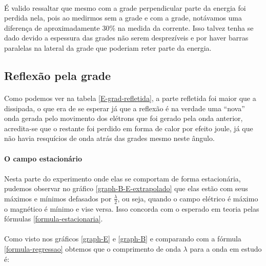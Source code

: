 \documentclass[a4paper,11pt]{article}
\begin{document}
	\paragraph{} É valido ressaltar que mesmo com a grade perpendicular parte da energia foi perdida nela, pois ao medirmos sem a grade e com a grade, notávamos uma diferença de aproximadamente 30\% na medida da corrente. Isso talvez tenha se dado devido a espessura das grades não serem desprezíveis e por haver barras paralelas na lateral da grade que poderiam reter parte da energia.
	
	\subsection{Reflexão pela grade}
	
	\paragraph{} Como podemos ver na tabela \ref{E-grad-refletida}, a parte refletida foi maior que a dissipada, o que era de se esperar já que a reflexão é na verdade uma “nova” onda gerada pelo movimento dos elétrons que foi gerado pela onda anterior, acredita-se que o restante foi perdido em forma de calor por efeito joule, já que não havia resquícios de onda atrás das grades mesmo neste ângulo.
	
	\paragraph{O campo estacionário}
	
	\paragraph{}Nesta parte do experimento onde elas se comportam de forma estacionária, pudemos observar no gráfico \ref{graph-B-E-extrapolado} que elas estão com seus máximos e mínimos defasados por $\frac{\lambda}{2}$, ou seja, quando o campo elétrico é máximo o magnético é mínimo e vise versa. Isso concorda com o esperado em teoria pelas fórmulas \ref{formula-estacionaria}.
	
	\paragraph{} Como visto nos gráficos \ref{graph-E} e \ref{graph-B} e comparando com a fórmula \ref{formula-regressao} obtemos que o comprimento de onda $\lambda$ para a onda em estudo é:
	
\end{document}
